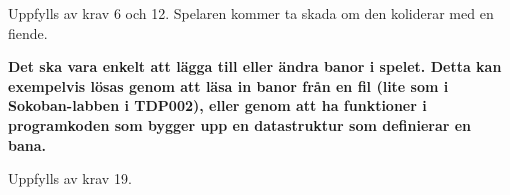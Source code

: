 \documentclass{TDP005mall}
\begin{document}
Uppfylls av krav 6 och 12. 
Spelaren kommer ta skada om den koliderar med en fiende.

\textbf{Det ska vara enkelt att lägga till eller ändra banor i spelet. Detta kan exempelvis lösas genom att läsa in banor från en fil (lite som i Sokoban-labben i TDP002), eller genom att ha funktioner i programkoden som bygger upp en datastruktur som definierar en bana.}

Uppfylls av krav 19.
\end{document}
